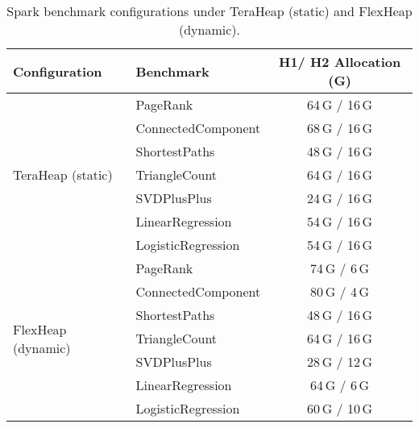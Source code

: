 \begin{table}[H]
\centering
\small
\renewcommand{\arraystretch}{1}
\caption{Spark benchmark configurations under TeraHeap (static) and FlexHeap (dynamic).}
\label{tab:spark-benchmark-configs}
\begin{tabular}{|l|l|c|}
\hline
\textbf{Configuration} & \textbf{Benchmark} & \textbf{H1/ H2 Allocation (G)} \\
\hline
\multirow{7}{*}{TeraHeap (static)} 
& PageRank             & 64\,G / 16\,G \\
& ConnectedComponent   & 68\,G / 16\,G \\
& ShortestPaths        & 48\,G / 16\,G \\
& TriangleCount        & 64\,G / 16\,G \\
& SVDPlusPlus          & 24\,G / 16\,G \\
& LinearRegression     & 54\,G / 16\,G \\
& LogisticRegression   & 54\,G / 16\,G \\
\hline
\multirow{7}{*}{FlexHeap (dynamic)} 
& PageRank             & 74\,G / 6\,G  \\
& ConnectedComponent   & 80\,G / 4\,G  \\
& ShortestPaths        & 48\,G / 16\,G \\
& TriangleCount        & 64\,G / 16\,G \\
& SVDPlusPlus          & 28\,G / 12\,G \\
& LinearRegression     & 64\,G / 6\,G  \\
& LogisticRegression   & 60\,G / 10\,G \\
\hline
\end{tabular}
\end{table}

%
%


